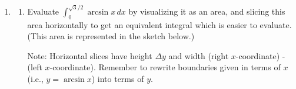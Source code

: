 \documentclass{article}
\begin{document}
\begin{enumerate}
\begin{enumerate}
    \begin{solution}
      Taking the limit as $n \to \infty$ of our Riemann sum, the exact
      area of $\mathcal{R}$ is $\boxed{\int_0^9 \left( 3\sqrt{x} -
      x \right) dx}$. 

      $\displaystyle \int_{0}^{9} (3\sqrt{x}-x)\,dx = \displaystyle \int_{0}^{9} (3x^{1/2}-x)\,dx = \displaystyle \left. \left(2x^{3/2}-\frac{1}{2}x^2\right) \right|_{0}^{9} = 54 - \frac{81}{2} = \frac{27}{2}$
    \end{solution}
 \pspace{\vfill \vfill}
  \end{enumerate}
  

\pspace{\newpage}

\item 

     \begin{enumerate}
     
        \item  Evaluate $\displaystyle \int_0^{\sqrt{3}/2} \arcsin x\,dx$ by visualizing it as an area, and slicing this area horizontally to get an
     equivalent integral which is easier to evaluate. (This area is represented in the sketch below.) 
     
     \begin{framed}
     Note: Horizontal slices have height $\Delta y$ and width (right $x$-coordinate) - (left $x$-coordinate). Remember to rewrite boundaries given in terms of $x$ (i.e., $y=\arcsin x$) into terms of $y$.
     \end{framed}



\end{enumerate}
\end{enumerate}
\end{document}
